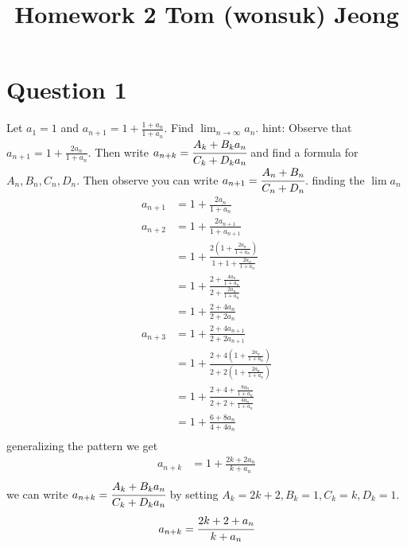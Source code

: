\documentclass{article}
\begin{document}

\title{Homework 2 Tom (wonsuk) Jeong  }
\maketitle

\section{Question 1} Let $a_1 = 1$ and $a_{n+1} = 1 + \frac{1 + a_n}{1 + a_n}$. Find $\lim_{n \to \infty} a_n$.
 hint: Observe that $a_{n+1} = 1 + \frac{2a_n}{1 + a_n}$. Then write $a_{n+k} = \cfrac{A_k + B_k a_n}{C_k + D_k a_n}$  and find a formula for $A_n, B_n, C_n, D_n$. Then observe you can write $a_{n+1} = \cfrac{A_n + B_n}{C_n + D_n}$.
    finding the $\lim a_n$ 
    \begin{align*}
        a_{n+1} &= 1 + \frac{2a_n}{1 + a_n} \\
        a_{n+2} &= 1 + \frac{2a_{n+1}}{1 + a_{n+1}} \\
        &= 1 + \frac{2(1 + \frac{2a_n}{1 + a_n})}{1 + 1 + \frac{2a_n}{1 + a_n}} \\
        &= 1 + \frac{2 + \frac{4a_n}{1 + a_n}}{2 + \frac{2a_n}{1 + a_n}} \\
        &= 1 + \frac{2 + 4a_n}{2 + 2a_n} \\
        a_{n+3} &= 1 + \frac{2 + 4a_{n+1}}{2 + 2a_{n+1}} \\
        &= 1 + \frac{2 + 4(1 + \frac{2a_n}{1 + a_n})}{2 + 2(1 + \frac{2a_n}{1 + a_n})} \\
        &= 1 + \frac{2 + 4 + \frac{8a_n}{1 + a_n}}{2 + 2 + \frac{4a_n}{1 + a_n}} \\
        &= 1 + \frac{6 + 8a_n}{4 + 4a_n} \\
    \end{align*}
    generalizing the pattern we get 
    \begin{align*}
        a_{n+k} &= 1 + \frac{2k + 2a_n}{k + a_n} \\
    \end{align*}
    we can write $a_{n+k} = \cfrac{A_k + B_k a_n}{C_k + D_k a_n}$ by setting $A_k = 2k + 2, B_k = 1, C_k = k, D_k = 1$.
    \begin{align*}
        a_{n+k} &= \cfrac{2k + 2 + a_n}{k + a_n} \\
    \end{align*}
\end{document}
